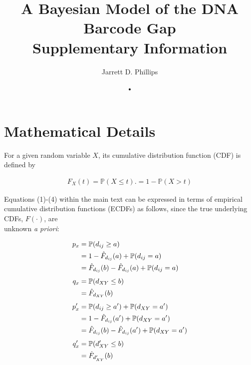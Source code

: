 \documentclass[12pt]{article}
\begin{document}
\title{A Bayesian Model of the DNA Barcode Gap \\ \vspace{5mm} Supplementary Information}

\author{Jarrett D. Phillips}

\date{•}

\maketitle

\section{Mathematical Details}

For a given random variable $X$, its cumulative distribution function (CDF) is defined by

\begin{align}
F_X(t) = \mathbb{P}(X \leq t).= 1 - \mathbb{P}(X > t) 
\end{align}

\noindent Equations (1)-(4) within the main text can be expressed in terms of empirical cumulative distribution functions (ECDFs) as follows, since the true underlying CDFs, $F(\cdot)$, are \\ unknown \textit{a priori}: 

\begin{align}
p_x  &= \mathbb{P}(d_{ij} \geq a) \notag \\
     &= 1 - \hat{F}_{d_{ij}}(a) + \mathbb{P}(d_{ij} = a) \notag \\
     &= \hat{F}_{d_{ij}}(b) - \hat{F}_{d_{ij}}(a) +  \mathbb{P}(d_{ij} = a) \\[1ex]
q_x  &=  \mathbb{P}(d_{XY} \leq b) \notag \\
     &= \hat{F}_{d_{XY}}(b) \\[1ex]
p'_x &=  \mathbb{P}(d_{ij} \geq a') +  \mathbb{P}(d_{XY} = a') \notag \\
     &= 1 - \hat{F}_{d_{ij}}(a') +  \mathbb{P}(d_{XY} = a') \notag \\
     &= \hat{F}_{d_{ij}}(b) - \hat{F}_{d_{ij}}(a') +  \mathbb{P}(d_{XY} = a')  \\[1ex]
q'_x &=  \mathbb{P}(d'_{XY} \leq b) \notag \\
     &= \hat{F}_{d'_{XY}}(b)
\end{align}
\end{document}
